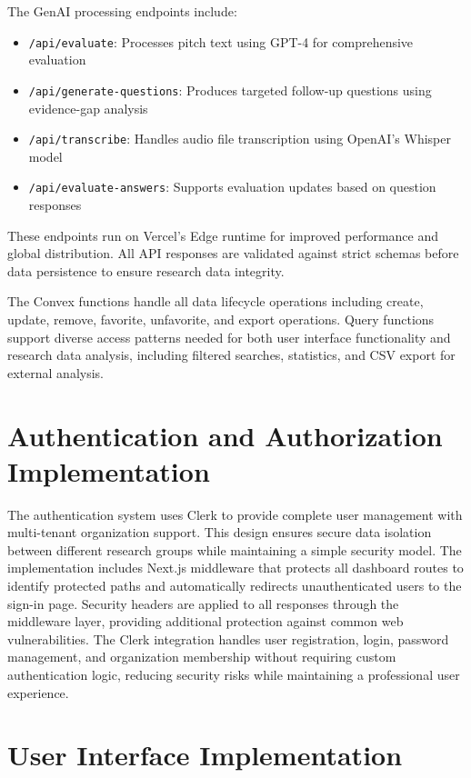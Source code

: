 The GenAI processing endpoints include:
\begin{itemize}
  \item \texttt{/api/evaluate}: Processes pitch text using GPT-4 for comprehensive evaluation
  \item \texttt{/api/generate-questions}: Produces targeted follow-up questions using evidence-gap analysis
  \item \texttt{/api/transcribe}: Handles audio file transcription using OpenAI's Whisper model
  \item \texttt{/api/evaluate-answers}: Supports evaluation updates based on question responses
\end{itemize}

These endpoints run on Vercel's Edge runtime for improved performance and global distribution. All API responses are validated against strict schemas before data persistence to ensure research data integrity.

The Convex functions handle all data lifecycle operations including create, update, remove, favorite, unfavorite, and export operations. Query functions support diverse access patterns needed for both user interface functionality and research data analysis, including filtered searches, statistics, and CSV export for external analysis.

\section{Authentication and Authorization Implementation}

The authentication system uses Clerk to provide complete user management with multi-tenant organization support. This design ensures secure data isolation between different research groups while maintaining a simple security model. The implementation includes Next.js middleware that protects all dashboard routes to identify protected paths and automatically redirects unauthenticated users to the sign-in page. Security headers are applied to all responses through the middleware layer, providing additional protection against common web vulnerabilities. The Clerk integration handles user registration, login, password management, and organization membership without requiring custom authentication logic, reducing security risks while maintaining a professional user experience.


\section{User Interface Implementation}

